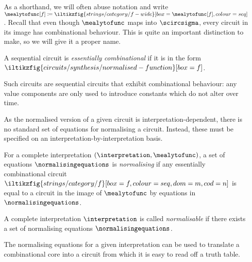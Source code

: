 As a shorthand, we will often abuse notation and write \(
\mealytofunc[f]
\coloneqq
\iltikzfig{strings/category/f-wide}[box=\mealytofunc[f],colour=seq]
\).
Recall that even though \(\mealytofunc\) maps into \(\scircsigma\), every
circuit in its image has combinational behaviour.
This is quite an important distinction to make, so we will give it a proper
name.

\begin{lemma}
    A sequential circuit is \emph{essentially combinational} if it is in the
    form \(
    \iltikzfig{circuits/synthesis/normalised-function}[box=f]
    \).
\end{lemma}

Such circuits are sequential circuits that exhibit combinational behaviour: any
value components are only used to introduce constants which do not alter over
time.

As the normalised version of a given circuit is interpretation-dependent, there
is no standard set of equations for normalising a circuit.
Instead, these must be specified on an interpretation-by-interpretation basis.

\begin{definition}
    For a complete interpretation \((\interpretation,\mealytofunc)\), a set of
    equations \(\normalisingequations\) is \emph{normalising} if any
    essentially combinational circuit \(
    \iltikzfig{strings/category/f}[box=f,colour=seq,dom=m,cod=n]
    \) is equal to a circuit in the image of \(\mealytofunc\) by equations in
    \(\normalisingequations\).
\end{definition}

\begin{definition}
    A complete interpretation \(\interpretation\) is called \emph{normalisable} if there
    exists a set of normalising equations \(\normalisingequations\).
\end{definition}

The normalising equations for a given interpretation can be used to translate a
combinational core into a circuit from which it is easy to read off a truth
table.

